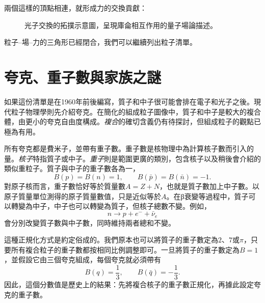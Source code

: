 兩個這樣的頂點相連，就形成力的交換貢獻：

\begin{figure}[h]
\centering
{}
\caption{光子交換的拓撲示意圖，呈現庫侖相互作用的量子場論描述。}
\end{figure}

粒子--場--力的三角形已經閉合，我們可以繼續列出粒子清單。

\section{夸克、重子數與家族之謎}

如果這份清單是在1960年前後編寫，質子和中子很可能會排在電子和光子之後。現代粒子物理學則先介紹夸克。在簡化的組成粒子圖像中，質子和中子是較大的複合體，由更小的夸克自由度構成。\emph{複合}的確切含義仍有待探討，但組成粒子的觀點已極為有用。

所有夸克都是費米子，並帶有重子數。重子數是核物理中為計算核子數而引入的量。\emph{核子}特指質子或中子。\emph{重子}則是範圍更廣的類別，包含核子以及稍後會介紹的類似重粒子。質子與中子的重子數各為一，
\begin{equation}
B(p)=B(n)=1,
\qquad
B(\bar p)=B(\bar n)=-1.
\end{equation}
對原子核而言，重子數恰好等於質量數\(A=Z+N\)，也就是質子數加上中子數。以原子質量單位測得的原子質量數值，只是近似等於\(A\)。在{\proseunicodefont β}衰變等過程中，質子可以轉變為中子，中子也可以轉變為質子，但核子總數不變。例如，
\begin{equation}
n\longrightarrow p+e^-+\bar\nu_e
\end{equation}
會分別改變質子數與中子數，同時維持兩者總和不變。

\begin{classroomqa}
\end{classroomqa}

這種正規化方式是約定俗成的。我們原本也可以將質子的重子數定為\(2\)、\(7\)或\(\pi\)，只要所有複合粒子的重子數都按相同比例調整即可。一旦將質子的重子數定為\(B=1\)，並假設它由三個夸克組成，每個夸克就必須帶有
\begin{equation}
B(q)=\frac13,
\qquad
B(\bar q)=-\frac13.
\end{equation}
因此，這個分數值是歷史上的結果：先將複合核子的重子數正規化，再據此設定夸克的重子數。

